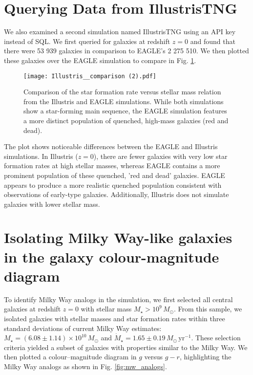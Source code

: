 \documentclass[10pt]{article}
\begin{document}
\section{Querying Data from IllustrisTNG}
We also examined a second simulation named IllustrisTNG using an API key instead of SQL. We first queried for galaxies at redshift $z=0$ and found that there were 53 939 galaxies in comparison to EAGLE's 2 275 510. We then plotted these galaxies over the EAGLE simulation to compare in Fig. \ref{fig:illustris_comparison}.

\begin{figure}[H]
    \centering
    \texttt{[image: Illustris\_\_comparison (2).pdf]}
    \caption{Comparison of the star formation rate versus stellar mass relation from the Illustris and EAGLE simulations. While both simulations show a star-forming main sequence, the EAGLE simulation features a more distinct population of quenched, high-mass galaxies (red and dead).}

    \label{fig:illustris_comparison}
\end{figure}

The plot shows noticeable differences between the EAGLE and Illustris simulations. In Illustris ($z = 0 $), there are fewer galaxies with very low star formation rates at high stellar masses, whereas EAGLE contains a more prominent population of these quenched, 'red and dead' galaxies. EAGLE appears to produce a more realistic quenched population consistent with observations of early-type galaxies. Additionally, Illustris does not simulate galaxies with lower stellar mass. 


\section{ Isolating Milky Way-like galaxies in the
galaxy colour-magnitude diagram}
To identify Milky Way analogs in the simulation, we first selected all central galaxies at redshift $z = 0$ with stellar mass $M_\star > 10^9 \, M_\odot$. From this sample, we isolated galaxies with stellar masses and star formation rates within three standard deviations of current Milky Way estimates: $M_\star = (6.08 \pm 1.14) \times 10^{10} \, M_\odot$ and $\dot{M}_\star = 1.65 \pm 0.19 \, M_\odot\,\text{yr}^{-1}$. These selection criteria yielded a subset of galaxies with properties similar to the Milky Way. We then plotted a colour–magnitude diagram in $g$ versus $g - r$, highlighting the Milky Way analogs as shown in Fig. \ref{fig:mw_analogs}.
\end{document}
